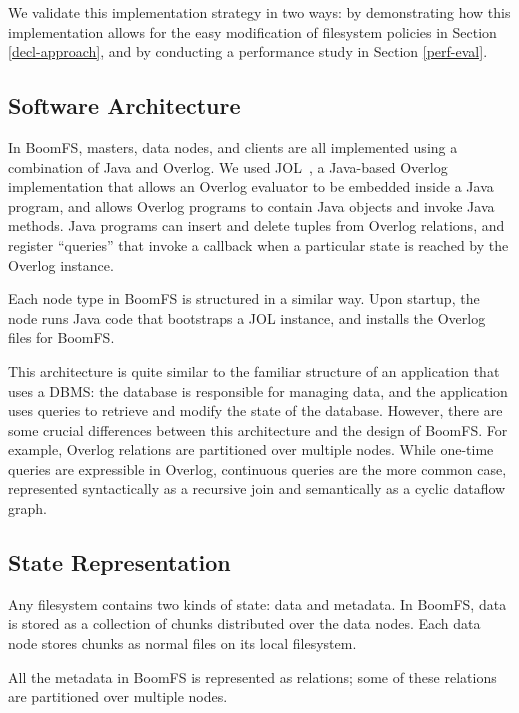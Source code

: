 \documentclass[twocolumn]{article}
\begin{document}
We validate this implementation strategy in two ways: by demonstrating
how this implementation allows for the easy modification of filesystem
policies in Section \ref{decl-approach}, and by conducting a performance
study in Section \ref{perf-eval}.

\subsection{Software Architecture}

In BoomFS, masters, data nodes, and clients are all implemented using
a combination of Java and Overlog. We used JOL~\cite{jol}, a
Java-based Overlog implementation that allows an Overlog evaluator to
be embedded inside a Java program, and allows Overlog programs to
contain Java objects and invoke Java methods. Java programs can insert
and delete tuples from Overlog relations, and register ``queries''
that invoke a callback when a particular state is reached by the
Overlog instance.

Each node type in BoomFS is structured in a similar way. Upon startup,
the node runs Java code that bootstraps a JOL instance, and installs
the Overlog files for BoomFS.

This architecture is quite similar to the familiar structure of an
application that uses a DBMS: the database is responsible for managing
data, and the application uses queries to retrieve and modify the
state of the database. However, there are some crucial differences
between this architecture and the design of BoomFS. For example,
Overlog relations are partitioned over multiple nodes.  While one-time
queries are expressible in Overlog, continuous queries are the more
common case, represented syntactically as a recursive join and
semantically as a cyclic dataflow graph.

\subsection{State Representation}
Any filesystem contains two kinds of state: data and metadata. In
BoomFS, data is stored as a collection of chunks distributed over the
data nodes. Each data node stores chunks as normal files on its
local filesystem.

All the metadata in BoomFS is represented as relations; some of these
relations are partitioned over multiple nodes.
\end{document}
